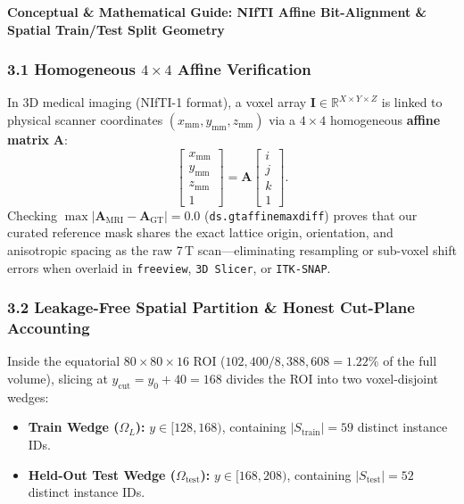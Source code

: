 \documentclass[10pt,a4paper]{article}
\renewcommand{\_}{\origunderscore\allowbreak}
\begin{document}
\begin{guidehdr}
{\small\bfseries\color{kiwigreen!75!black}Conceptual \& Mathematical Guide: NIfTI Affine Bit-Alignment \& Spatial Train/\allowbreak{}Test Split Geometry}
\end{guidehdr}

\subsubsection*{3.1 Homogeneous $4 \times 4$ Affine Verification}
In 3D medical imaging (NIfTI-1 format), a voxel array $\mathbf{I} \in \mathbb{R}^{X \times Y \times Z}$ is linked to physical scanner coordinates $(x_{\text{mm}}, y_{\text{mm}}, z_{\text{mm}})$ via a $4 \times 4$ homogeneous \textbf{affine matrix} $\mathbf{A}$:
\[
\begin{bmatrix} x_{\text{mm}} \\ y_{\text{mm}} \\ z_{\text{mm}} \\ 1 \end{bmatrix} = \mathbf{A} \begin{bmatrix} i \\ j \\ k \\ 1 \end{bmatrix}.
\]
Checking $\max|\mathbf{A}_{\text{MRI}} - \mathbf{A}_{\text{GT}}| = 0.0$ (\texttt{ds.gt\_affine\_max\_diff}) proves that our curated reference mask shares the exact lattice origin, orientation, and anisotropic spacing as the raw 7\,T scan---eliminating resampling or sub-voxel shift errors when overlaid in \texttt{freeview}, \texttt{3D Slicer}, or \texttt{ITK-SNAP}.

\subsubsection*{3.2 Leakage-Free Spatial Partition \& Honest Cut-Plane Accounting}
Inside the equatorial $80 \times 80 \times 16$ ROI ($102{,}400 / 8{,}388{,}608 = 1.22\%$ of the full volume), slicing at $y_{\text{cut}} = y_0 + 40 = 168$ divides the ROI into two voxel-disjoint wedges:
\begin{itemize}
\item \textbf{Train Wedge ($\Omega_L$):} $y \in [128, 168)$, containing $|S_{\text{train}}| = 59$ distinct instance IDs.
\item \textbf{Held-Out Test Wedge ($\Omega_{\text{test}}$):} $y \in [168, 208)$, containing $|S_{\text{test}}| = 52$ distinct instance IDs.
\end{itemize}
\end{document}
